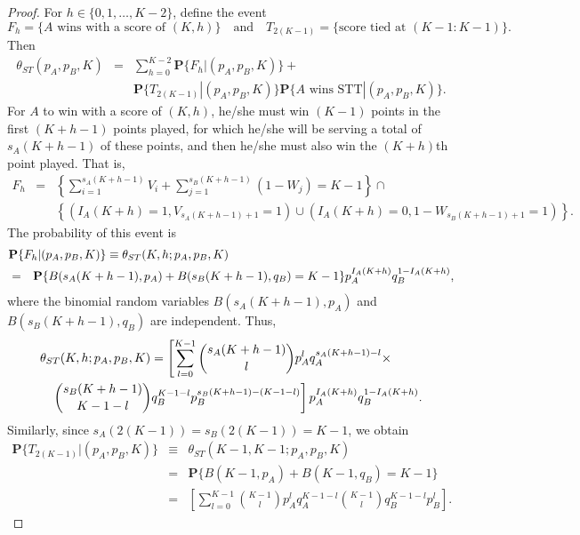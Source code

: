 \documentclass[10pt,a4paper]{amsart}
\newcommand{\BLUE}[1]{{\color{blue} #1}}
\renewcommand{\Pr}{\mathbf{P}}
\begin{document}
\begin{proof}



For $h \in \{0,1,\ldots,K-2\}$, define the event
%
$$F_h = \{\mbox{$A$ wins with a score of $(K,h)$}\} \quad \mbox{and} \quad 
T_{2(K-1)} = \{\mbox{score tied at $(K-1:K-1)$\}.}$$
%
Then
%
\begin{eqnarray*}
\theta_{ST}(p_A,p_B,K) & = & \sum_{h=0}^{K-2} \Pr\{F_h|(p_A,p_B,K)\} + \\ && 
\Pr\{T_{2(K-1)}|(p_A,p_B,K)\} \Pr\{\mbox{$A$ wins STT}|(p_A,p_B,K)\}.
\end{eqnarray*}
%
For $A$ to win with a score of $(K,h)$, he/she must win $(K-1)$ points in the first $(K+h-1)$ points played, for which he/she will be serving a total of $s_A(K+h-1)$ of these points, and then he/she must also win the $(K+h)$th point played. That is,
%
\begin{eqnarray*}
F_h & = & \left\{\sum_{i=1}^{s_A(K+h-1)} V_i + \sum_{j=1}^{s_B(K+h-1)} (1 - W_j) = K-1\right\} \cap \\ &&
\left\{(I_A(K+h) = 1, V_{s_A(K+h-1)+1} = 1) \cup 
(I_A(K+h) = 0, 1-W_{s_B(K+h-1)+1} = 1)\right\}.
\end{eqnarray*}
%
The probability of this event is
%
\begin{eqnarray*} 
\lefteqn{\Pr\{F_h|(p_A,p_B,K)\}  \equiv \theta_{ST}(K,h;p_A,p_B,K) } \\
& = & \Pr\{B(s_A(K+h-1),p_A) + B(s_B(K+h-1),q_B) = K-1\} p_A^{I_A(K+h)} q_B^{1-I_A(K+h)},
\end{eqnarray*}
%
where the binomial random variables $B(s_A(K+h-1),p_A)$ and $B(s_B(K+h-1),q_B)$ are independent. Thus,
%
\begin{eqnarray*}
\lefteqn{ \theta_{ST}(K,h;p_A,p_B,K)  =   
\left[\sum_{l=0}^{K-1}
{{s_A(K+h-1)} \choose l} p_A^l q_A^{{s_A(K+h-1)}-l} \times \right. } \\ && \left. {{s_B(K+h-1)} \choose {K-1-l}} q_B^{K-1-l} p_B^{s_B(K+h-1)-(K-1-l)}\right]  p_A^{I_A(K+h)} q_B^{1-I_A(K+h)}.
\end{eqnarray*}
%
Similarly, since $s_A(2(K-1)) = s_B(2(K-1)) = K-1$, we obtain
%
\begin{eqnarray*}
   \Pr\{T_{2(K-1)}|(p_A,p_B,K)\} & \equiv & \theta_{ST}(K-1,K-1;p_A,p_B,K) \\  & = & \Pr\{B(K-1,p_A) + B(K-1,q_B) = K-1\}  \\
    & = & \left[\sum_{l=0}^{K-1}
{{K-1} \choose l} p_A^l q_A^{{K-1}-l} {{K-1} \choose {l}} q_B^{K-1-l} p_B^{l}\right].
\end{eqnarray*}


\end{proof}
\end{document}
